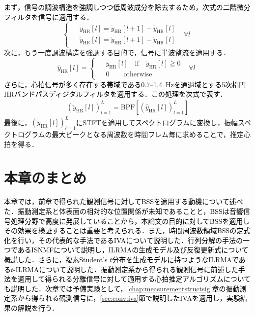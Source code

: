 \textcolor{black}{まず，信号の調波構造を強調しつつ低周波成分を除去するため，次式の二階微分フィルタを信号に適用する．}
\begin{equation} 
    \begin{cases}
        \begin{split}
        & \dot{y}_\mathrm{HR}[l]=\tilde{y}_\mathrm{HR}[l+1]-\tilde{y}_\mathrm{HR}[l] \\
        & \ddot{y}_\mathrm{HR}[l]=\dot{y}_\mathrm{HR}[l+1]-\dot{y}_\mathrm{HR}[l]
        \end{split}                         &   \forall{l}
    \end{cases}
\end{equation}
次に，もう一度調波構造を強調する目的で，信号に半波整流を適用する．
\begin{equation} 
\hat{y}_{\mathrm{HR}}[l] =
    \begin{cases}
        \begin{split}
        & \ddot{y}_\mathrm{HR}[l]\quad \mathrm{if}\quad \ddot{y}_\mathrm{HR}[l]\geqq0 \\
        & 0\hspace{25pt} \mathrm{otherwise}
        \end{split}                         &   \forall{l}
    \end{cases}
\end{equation}
\textcolor{black}{さらに，心拍信号が多く存在する帯域である0.7--1.4~Hzを通過域とする5次楕円IIRバンドパスディジタルフィルタを適用する．この処理を次式で表す．}
\begin{align}
    \left(\breve{y}_{\mathrm{HR}}[l]\right)_{l=1}^{L}=\mathrm{BPF}\left[\left(\hat{y}_{\mathrm{HR}}[l]\right)_{l=1}^{L}\right]
\end{align} \label{eq:bpf}
最後に，$( \breve{y}_{\mathrm{HR}}[l] )_{l=1}^L$にSTFTを適用してスペクトログラムに変換し，振幅スペクトログラムの最大ピークとなる周波数を時間フレム毎に求めることで，推定心拍を得る．

\section{本章のまとめ}
\label{sec:conv:conclusion3}
\textcolor{black}{本章では，前章で得られた観測信号に対してBSSを適用する動機について述べた．振動測定系と体表面の相対的な位置関係が未知であることと，BSSは音響信号処理分野で高度に発展していることから，本論文の目的に対してBSSを適用しその効果を検証することは重要と考えられる．また，時間周波数領域BSSの定式化を行い，その代表的な手法であるIVAについて説明した．行列分解の手法の一つであるISNMFについて説明し，ILRMAの生成モデル及び反復更新式について概説した．さらに，複素Student's $t$分布を生成モデルに持つようなILRMAである$t$-ILRMAについて説明した．振動測定系から得られる観測信号に前述した手法を適用して得られる分離信号に対して適用する心拍推定アルゴリズムについても説明した．次章では予備実験として，\ref{chap:measurementstructsig}章の振動測定系から得られる観測信号に，\ref{sec:conv:iva}節で説明したIVAを適用し，実験結果の解説を行う．}

